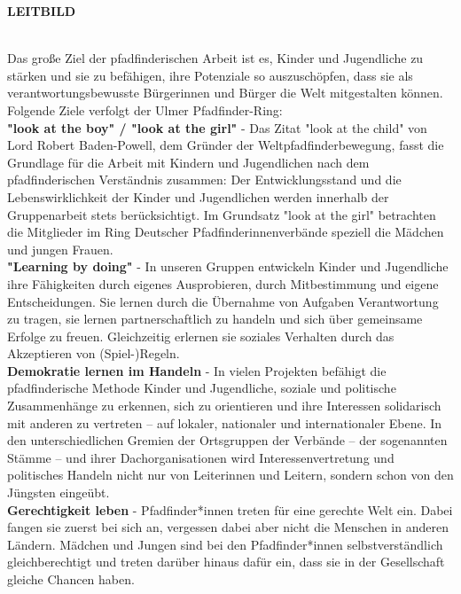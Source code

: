 \begin{Large}
    \textbf{LEITBILD}
\end{Large}
\\

Das große Ziel der pfadfinderischen Arbeit ist es, Kinder und Jugendliche zu stärken und sie zu 
befähigen, ihre Potenziale so auszuschöpfen, dass sie als verantwortungsbewusste Bürgerinnen und 
Bürger die Welt mitgestalten können. Folgende Ziele verfolgt der Ulmer Pfadfinder-Ring:
\\

\textbf{"look at the boy" / "look at the girl"} - Das Zitat "look at the child" von Lord Robert Baden-Powell, 
dem Gründer der Weltpfadfinderbewegung, fasst die Grundlage für die Arbeit mit Kindern und 
Jugendlichen nach dem pfadfinderischen Verständnis zusammen: Der Entwicklungsstand und die 
Lebenswirklichkeit der Kinder und Jugendlichen werden innerhalb der Gruppenarbeit stets 
berücksichtigt. Im Grundsatz "look at the girl" betrachten die Mitglieder im Ring Deutscher 
Pfadfinderinnenverbände speziell die Mädchen und jungen Frauen.
\\

\textbf{"Learning by doing"} - In unseren Gruppen entwickeln Kinder und Jugendliche ihre Fähigkeiten durch 
eigenes Ausprobieren, durch Mitbestimmung und eigene Entscheidungen. Sie lernen durch die Übernahme 
von Aufgaben Verantwortung zu tragen, sie lernen partnerschaftlich zu handeln und sich über 
gemeinsame Erfolge zu freuen. Gleichzeitig erlernen sie soziales Verhalten durch das Akzeptieren 
von (Spiel-)Regeln.
\\

\textbf{Demokratie lernen im Handeln} - In vielen Projekten befähigt die pfadfinderische Methode Kinder und 
Jugendliche, soziale und politische Zusammenhänge zu erkennen, sich zu orientieren und ihre 
Interessen solidarisch mit anderen zu vertreten – auf lokaler, nationaler und internationaler Ebene. 
In den unterschiedlichen Gremien der Ortsgruppen der Verbände – der sogenannten Stämme – und ihrer 
Dachorganisationen wird Interessenvertretung und politisches Handeln nicht nur von Leiterinnen und 
Leitern, sondern schon von den Jüngsten eingeübt.
\\

\textbf{Gerechtigkeit leben} - Pfadfinder*innen treten für eine gerechte Welt ein. Dabei fangen sie zuerst 
bei sich an, vergessen dabei aber nicht die Menschen in anderen Ländern. Mädchen und Jungen sind bei 
den Pfadfinder*innen selbstverständlich gleichberechtigt und treten darüber hinaus dafür ein, dass 
sie in der Gesellschaft gleiche Chancen haben.
\\

